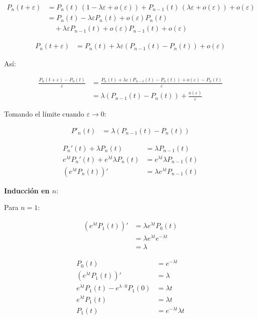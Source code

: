 \documentclass[12pt,a4paper]{article}
\begin{document}
\begin{align*}
P_n(t+\varepsilon) 
&= P_n(t)\,(1 - \lambda \varepsilon + o(\varepsilon)) 
   + P_{n-1}(t)\,(\lambda \varepsilon + o(\varepsilon)) 
   + o(\varepsilon) \\
&= P_n(t) - \lambda \varepsilon P_n(t) + o(\varepsilon)P_n(t) \\
&\quad + \lambda \varepsilon P_{n-1}(t) + o(\varepsilon)P_{n-1}(t) 
   + o(\varepsilon)
\end{align*}

\begin{align*}
P_n(t+\varepsilon) &= P_n(t) + \lambda \varepsilon (P_{n-1}(t) - P_n(t)) + o(\varepsilon)
\end{align*}

Así:

\begin{align*}
\frac{P_n(t+\varepsilon) - P_n(t)}{\varepsilon} 
&= \frac{P_n(t) + \lambda \varepsilon (P_{n-1}(t) - P_n(t)) + o(\varepsilon) - P_n(t)}{\varepsilon} \\
&= \lambda (P_{n-1}(t) - P_n(t)) + \frac{o(\varepsilon)}{\varepsilon}
\end{align*}

Tomando el límite cuando $\varepsilon \to 0$:

\begin{align*}
P'_n(t) &= \lambda (P_{n-1}(t) - P_n(t))
\end{align*}

\begin{align*}
P_n'(t) + \lambda P_n(t) &= \lambda P_{n-1}(t) \\
e^{\lambda t} P_n'(t) + e^{\lambda t} \lambda P_n(t) &= e^{\lambda t} \lambda P_{n-1}(t) \\
\left(e^{\lambda t} P_n(t)\right)' &= \lambda e^{\lambda t} P_{n-1}(t)
\end{align*}

\textbf{Inducción en $n$}:

Para $n=1$:

\begin{align*}
\left(e^{\lambda t} P_1(t)\right)' &= \lambda e^{\lambda t} P_0(t) \\
                                   &= \lambda e^{\lambda t} e^{-\lambda t} \\
                                   &= \lambda
\end{align*}

\begin{align*}
P_0(t) &= e^{-\lambda t} \\
\left(e^{\lambda t} P_1(t)\right)' &= \lambda \\
e^{\lambda t} P_1(t) - e^{\lambda \cdot 0} P_1(0) &= \lambda t \\
e^{\lambda t} P_1(t) &= \lambda t \\
P_1(t) &= e^{-\lambda t} \lambda t
\end{align*}
\end{document}
